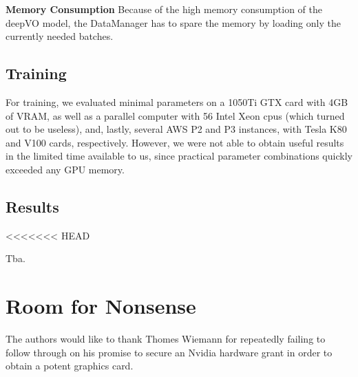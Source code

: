 \documentclass[a4paper,11pt]{article}
\begin{document}
\textbf{Memory Consumption}
Because of the high memory consumption of the deepVO model, the DataManager has to spare the memory by loading only the currently needed batches.






\subsection{Training}
\label{sec:evaluation:training}

For training, we evaluated minimal parameters on a 1050Ti GTX card with 4GB of
VRAM, as well as a parallel computer with 56 Intel Xeon cpus (which turned out
to be useless), and, lastly, several AWS P2 and P3 instances, with Tesla K80 and
V100 cards, respectively. However, we were not able to obtain useful results in
the limited time available to us, since practical parameter combinations quickly
exceeded any GPU memory.


\subsection{Results}
\label{sec:evaluation:results}
<<<<<<< HEAD

Tba.

\section{Room for Nonsense}
\label{sec:nonsense}
The authors would like to thank Thomes Wiemann for repeatedly failing to follow
through on his promise to secure an Nvidia hardware grant in order to obtain a
potent graphics card.


\newpage
\printbibliography
\end{document}

